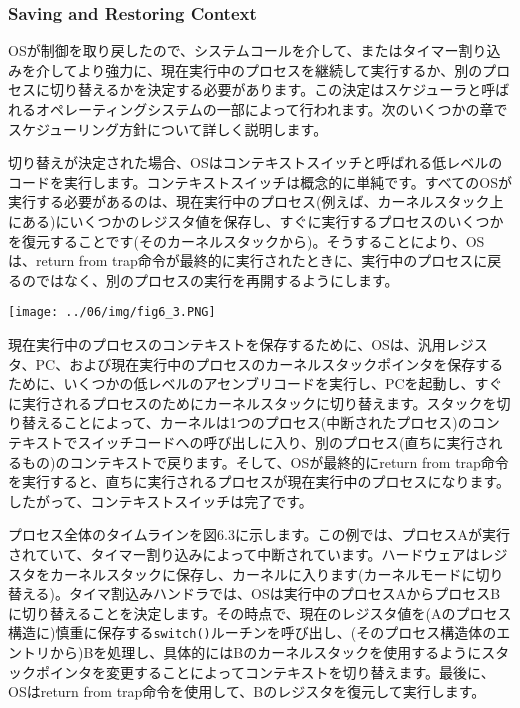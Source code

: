 \hypertarget{saving-and-restoring-context}{%
\subsubsection*{Saving and Restoring
Context}\label{saving-and-restoring-context}}

OSが制御を取り戻したので、システムコールを介して、またはタイマー割り込みを介してより強力に、現在実行中のプロセスを継続して実行するか、別のプロセスに切り替えるかを決定する必要があります。この決定はスケジューラと呼ばれるオペレーティングシステムの一部によって行われます。次のいくつかの章でスケジューリング方針について詳しく説明します。

切り替えが決定された場合、OSはコンテキストスイッチと呼ばれる低レベルのコードを実行します。コンテキストスイッチは概念的に単純です。すべてのOSが実行する必要があるのは、現在実行中のプロセス(例えば、カーネルスタック上にある)にいくつかのレジスタ値を保存し、すぐに実行するプロセスのいくつかを復元することです(そのカーネルスタックから)。そうすることにより、OSは、return
from
trap命令が最終的に実行されたときに、実行中のプロセスに戻るのではなく、別のプロセスの実行を再開するようにします。

\texttt{[image: ../06/img/fig6\_3.PNG]}

現在実行中のプロセスのコンテキストを保存するために、OSは、汎用レジスタ、PC、および現在実行中のプロセスのカーネルスタックポインタを保存するために、いくつかの低レベルのアセンブリコードを実行し、PCを起動し、すぐに実行されるプロセスのためにカーネルスタックに切り替えます。スタックを切り替えることによって、カーネルは1つのプロセス(中断されたプロセス)のコンテキストでスイッチコードへの呼び出しに入り、別のプロセス(直ちに実行されるもの)のコンテキストで戻ります。そして、OSが最終的にreturn
from
trap命令を実行すると、直ちに実行されるプロセスが現在実行中のプロセスになります。したがって、コンテキストスイッチは完了です。

プロセス全体のタイムラインを図6.3に示します。この例では、プロセスAが実行されていて、タイマー割り込みによって中断されています。ハードウェアはレジスタをカーネルスタックに保存し、カーネルに入ります(カーネルモードに切り替える)。タイマ割込みハンドラでは、OSは実行中のプロセスAからプロセスBに切り替えることを決定します。その時点で、現在のレジスタ値を(Aのプロセス構造に)慎重に保存する\texttt{switch()}ルーチンを呼び出し、(そのプロセス構造体のエントリから)Bを処理し、具体的にはBのカーネルスタックを使用するようにスタックポインタを変更することによってコンテキストを切り替えます。最後に、OSはreturn
from trap命令を使用して、Bのレジスタを復元して実行します。

